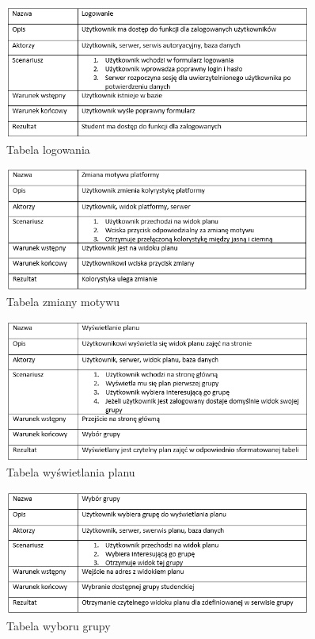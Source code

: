 \documentclass[a4paper,11pt]{uzreport}
\begin{document}
     \begin{figure}[ht!]
        \centering
        \includegraphics[width=0.9\textwidth]{pictures/logowanie.PNG}
        \caption{Tabela logowania}
        \label{fig5}
     \end{figure}

     \begin{figure}[ht!]
        \centering
        \includegraphics[width=0.9\textwidth]{pictures/zmiana_motywu.PNG}
        \caption{Tabela zmiany motywu}
        \label{fig6}
     \end{figure}

     \begin{figure}[ht!]
        \centering
        \includegraphics[width=0.9\textwidth]{pictures/wyswietlanie planu.PNG}
        \caption{Tabela wyświetlania planu}
        \label{fig7}
     \end{figure}

     \begin{figure}[ht!]
        \centering
        \includegraphics[width=0.9\textwidth]{pictures/wybor grupy.PNG}
        \caption{Tabela wyboru grupy}
        \label{fig8}
     \end{figure}
\end{document}
